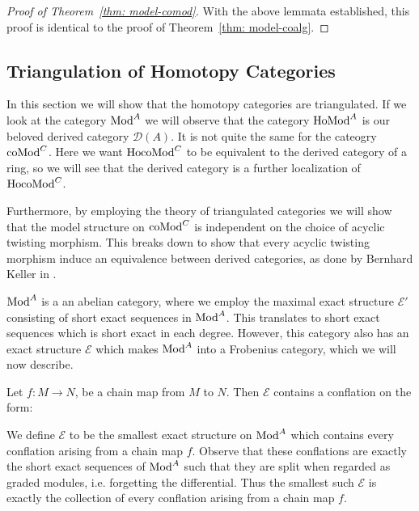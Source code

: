 \documentclass[../thesis.tex]{subfiles}
\begin{document}
            \begin{proof}[Proof of Theorem~\ref{thm: model-comod}]
                With the above lemmata established, this proof is identical to the proof of Theorem~\ref{thm: model-coalg}.
            \end{proof}

        \subsection{Triangulation of Homotopy Categories}
            In this section we will show that the homotopy categories are triangulated. If we look at the category $\tt{Mod}^A$ we will observe that the category $\tt{Ho} \tt{Mod}^A$ is our beloved derived category $\mathcal{D}(A)$. It is not quite the same for the cateogry $\tt{coMod}^C$. Here we want $\tt{Ho} \tt{coMod}^C$ to be equivalent to the derived category of a ring, so we will see that the derived category is a further localization of $\tt{Ho} \tt{coMod}^C$.

            Furthermore, by employing the theory of triangulated categories we will show that the model structure on $\tt{coMod}^C$ is independent on the choice of acyclic twisting morphism. This breaks down to show that every acyclic twisting morphism induce an equivalence between derived categories, as done by Bernhard Keller in \cite{Keller94}.

            $\tt{Mod}^A$ is a an abelian category, where we employ the maximal exact structure $\mathcal{E}'$ consisting of short exact sequences in $\tt{Mod}^A$. This translates to short exact sequences which is short exact in each degree. However, this category also has an exact structure $\mathcal{E}$ which makes $\tt{Mod}^A$ into a Frobenius category, which we will now describe.

            Let $f : M \rightarrow N$, be a chain map from $M$ to $N$. Then $\mathcal{E}$ contains a conflation on the form:
            \begin{center}
            \end{center}
            We define $\mathcal{E}$ to be the smallest exact structure on $\tt{Mod}^A$ which contains every conflation arising from a chain map $f$. Observe that these conflations are exactly the short exact sequences of $\tt{Mod}^A$ such that they are split when regarded as graded modules, i.e. forgetting the differential. Thus the smallest such $\mathcal{E}$ is exactly the collection of every conflation arising from a chain map $f$.
\end{document}
